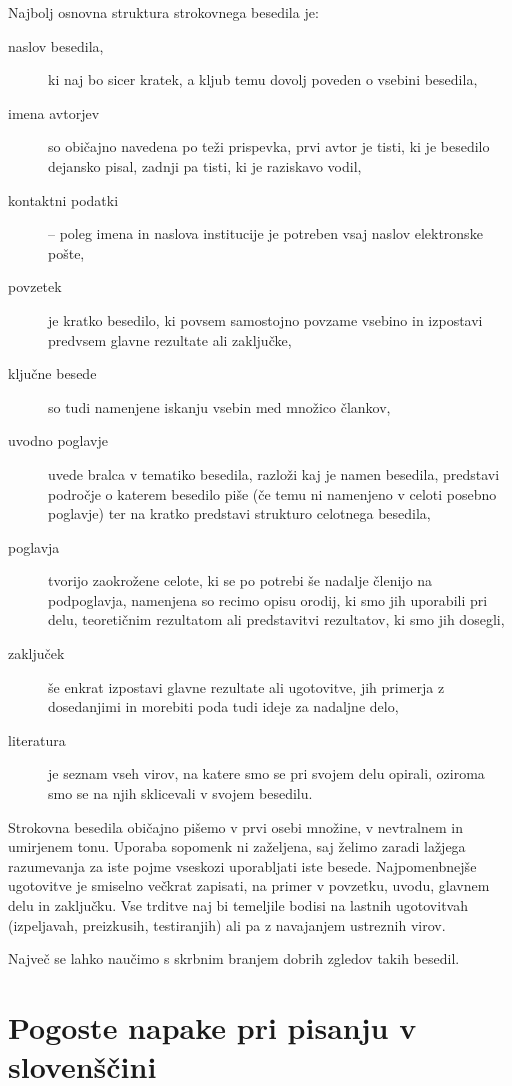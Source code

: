 \documentclass[a4paper, 12pt]{book}
\begin{document}
Najbolj osnovna struktura strokovnega besedila je:
\begin{description}
\item[naslov besedila,] ki naj bo sicer kratek, a kljub temu dovolj poveden o vsebini besedila,
\item[imena avtorjev] so običajno navedena po teži prispevka, prvi avtor je tisti, ki je besedilo dejansko pisal, zadnji pa tisti, ki je raziskavo vodil,
\item[kontaktni podatki] -- poleg imena in naslova institucije je potreben vsaj naslov elektronske pošte,
\item[povzetek] je kratko besedilo, ki povsem samostojno povzame vsebino in izpostavi predvsem  glavne rezultate ali zaključke,
\item[ključne besede] so tudi namenjene iskanju vsebin med množico člankov,
\item[uvodno poglavje] uvede bralca v tematiko besedila, razloži kaj je namen besedila, predstavi področje o katerem besedilo piše 
(če temu ni namenjeno v celoti posebno poglavje) ter na kratko predstavi strukturo celotnega besedila,
\item[poglavja] tvorijo zaokrožene celote, ki se po potrebi še nadalje členijo na podpoglavja, namenjena so recimo opisu orodij, 
ki smo jih uporabili pri delu, teoretičnim rezultatom ali predstavitvi rezultatov, ki smo jih dosegli,
\item[zaključek] še enkrat izpostavi glavne rezultate ali ugotovitve, jih primerja z dosedanjimi in morebiti poda tudi ideje za nadaljne delo,
\item[literatura] je seznam vseh virov, na katere smo se pri svojem delu opirali, oziroma smo se na njih sklicevali v svojem besedilu.
\end{description}

Strokovna besedila običajno pišemo v prvi osebi množine, v nevtralnem in umirjenem tonu. 
Uporaba sopomenk ni zaželjena, saj želimo zaradi lažjega razumevanja za iste pojme vseskozi uporabljati iste besede.
Najpomenbnejše ugotovitve je smiselno večkrat zapisati, na primer v povzetku, uvodu, glavnem delu in zaključku.
Vse trditve naj bi temeljile bodisi na lastnih ugotovitvah (izpeljavah, preizkusih, testiranjih) ali pa z navajanjem ustreznih virov.

Največ se lahko naučimo s skrbnim branjem dobrih zgledov takih besedil.


\chapter{Pogoste napake pri pisanju v slovenščini}  %
\label{slo}
\end{document}
